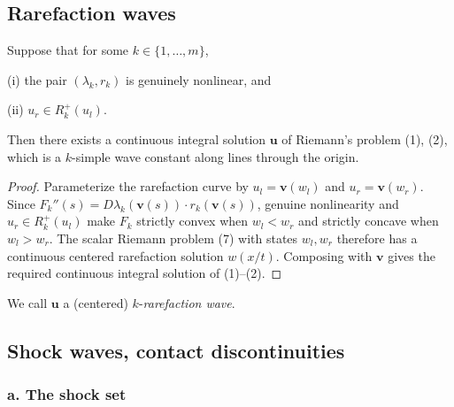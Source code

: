 \subsection{Rarefaction waves}\label{sec:rarefaction-waves}

\begin{theorem}
\label{thm:existence-k-rarefaction-waves}
Suppose that for some $k\in\{1,\ldots,m\}$,

(i) the pair $(\lambda_k, r_k)$ is genuinely nonlinear, and

(ii) $u_r \in R_k^+(u_l)$.

Then there exists a continuous integral solution $\mathbf{u}$ of Riemann's problem (1), (2), which is a $k$-simple wave constant along lines through the origin.
\end{theorem}

\begin{proof}
\sketch Parameterize the rarefaction curve by $u_l=\mathbf v(w_l)$ and $u_r=\mathbf v(w_r)$. Since
$F_k''(s)=D\lambda_k(\mathbf v(s))\cdot r_k(\mathbf v(s))$, genuine nonlinearity and $u_r\in R_k^+(u_l)$ make $F_k$ strictly convex when $w_l<w_r$ and strictly concave when $w_l>w_r$. The scalar Riemann problem (7) with states $w_l,w_r$ therefore has a continuous centered rarefaction solution $w(x/t)$. Composing with $\mathbf v$ gives the required continuous integral solution of (1)--(2).
\end{proof}

\begin{remark}
\label{rem:k-rarefaction-wave-terminology}
We call $\mathbf{u}$ a (centered) $k$-\textit{rarefaction wave}.
\end{remark}

\subsection{Shock waves, contact discontinuities}\label{sec:shock-waves-contact-discontinuities}

\subsubsection*{a. The shock set}

